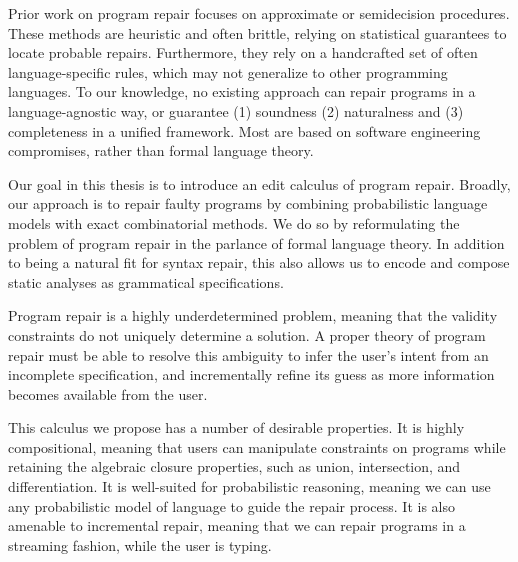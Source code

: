 Prior work on program repair focuses on approximate or semidecision procedures. These methods are heuristic and often brittle, relying on statistical guarantees to locate probable repairs. Furthermore, they rely on a handcrafted set of often language-specific rules, which may not generalize to other programming languages. To our knowledge, no existing approach can repair programs in a language-agnostic way, or guarantee (1) soundness (2) naturalness and (3) completeness in a unified framework. Most are based on software engineering compromises, rather than formal language theory.

Our goal in this thesis is to introduce an edit calculus of program repair. Broadly, our approach is to repair faulty programs by combining probabilistic language models with exact combinatorial methods. We do so by reformulating the problem of program repair in the parlance of formal language theory. In addition to being a natural fit for syntax repair, this also allows us to encode and compose static analyses as grammatical specifications.

Program repair is a highly underdetermined problem, meaning that the validity constraints do not uniquely determine a solution. A proper theory of program repair must be able to resolve this ambiguity to infer the user's intent from an incomplete specification, and incrementally refine its guess as more information becomes available from the user.

This calculus we propose has a number of desirable properties. It is highly compositional, meaning that users can manipulate constraints on programs while retaining the algebraic closure properties, such as union, intersection, and differentiation. It is well-suited for probabilistic reasoning, meaning we can use any probabilistic model of language to guide the repair process. It is also amenable to incremental repair, meaning that we can repair programs in a streaming fashion, while the user is typing.

\clearpage